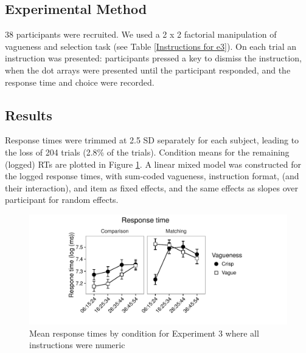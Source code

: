 \subsection{Experimental Method} %

38 participants were recruited. We used a 2 x 2 factorial manipulation of vagueness and selection task (see Table \ref{Instructions for e3}).
On each trial an instruction was presented: participants pressed a key to dismiss the instruction, when the dot arrays were presented until the participant responded, and the response time and choice were recorded.

\subsection{Results} %

Response times were trimmed at 2.5 SD separately for each subject, leading to the loss of 204 trials (2.8\% of the trials).
Condition means for the remaining (logged) RTs are plotted in Figure \ref{resultse3}.
A linear mixed model was constructed for the logged response times, 
with sum-coded vagueness, instruction format, (and their interaction), and item as fixed effects, and the same effects as slopes over participant for random effects.

\begin{figure}[htbp]
\centering
\includegraphics[width=\textwidth]{figures/e3-rtplot-1.pdf}
\caption{Mean response times by condition for Experiment 3 where all instructions were numeric}
\label{resultse3}
\end{figure}

